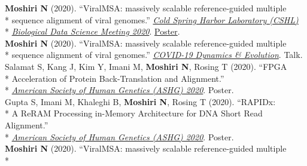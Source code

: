 \documentclass[margin,line]{res}
\begin{document}
\begin{resume}
\hspace*{4mm} \textbf{Moshiri N} (2020). ``ViralMSA: massively scalable reference-guided multiple\\*
\hspace*{9.5mm} sequence alignment of viral genomes.'' \href{http://meetings.cshl.edu/meetings.aspx?meet=DATA&year=20}{\textit{Cold Spring Harbor Laboratory (CSHL)}}\\*\vspace{2mm}
\hspace*{8mm} \href{http://meetings.cshl.edu/meetings.aspx?meet=DATA&year=18}{\textit{Biological Data Science Meeting 2020}}. \href{https://meetings.cshl.edu/posters/data20/data2020_AbstractBookVirtual.pdf}{Poster}.\\
\hspace*{4mm} \textbf{Moshiri N} (2020). ``ViralMSA: massively scalable reference-guided multiple\\*\vspace{2mm}
\hspace*{8mm} sequence alignment of viral genomes.'' \href{https://cpd.ucsd.edu/covid19/}{\textit{COVID-19 Dynamics \& Evolution}}. Talk.\\
\hspace*{4mm} Salamat S, Kang J, Kim Y, Imani M, \textbf{Moshiri N}, Rosing T (2020). ``FPGA\\*
\hspace*{9.5mm} Acceleration of Protein Back-Translation and Alignment.''\\*\vspace{2mm}
\hspace*{7mm} \href{https://www.ashg.org/meetings/2020meeting}{\textit{American Society of Human Genetics (ASHG) 2020}}. Poster.\\
\hspace*{4mm} Gupta S, Imani M, Khaleghi B, \textbf{Moshiri N}, Rosing T (2020). ``RAPIDx:\\*
\hspace*{9.5mm} A ReRAM Processing in-Memory Architecture for DNA Short Read Alignment.''\\*\vspace{2mm}
\hspace*{7mm} \href{https://www.ashg.org/meetings/2020meeting}{\textit{American Society of Human Genetics (ASHG) 2020}}. Poster.\\
\hspace*{4mm} \textbf{Moshiri N} (2020). ``ViralMSA: massively scalable reference-guided multiple\\*

\end{resume}
\end{document}
